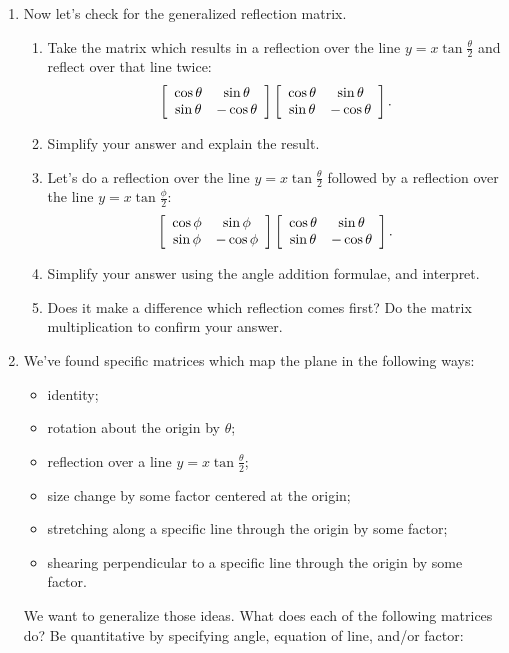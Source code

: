 \documentclass[../textbook.tex]{subfiles}
\begin{document}
\begin{enumerate}
\begin{enumerate}
\end{enumerate}
\item Now let's check for the generalized reflection matrix.
\begin{enumerate}
\item Take the matrix which results in a reflection over the line $y=x\tan \frac{\theta}{2}$ and reflect over that line twice: $$\left[\begin{array}{cc} \cos\theta & \sin\theta \\ \sin\theta & -\cos\theta \end{array}\right]\left[\begin{array}{cc} \cos\theta & \sin\theta \\ \sin\theta & -\cos\theta \end{array}\right].$$
\item Simplify your answer and explain the result.
\item Let's do a reflection over the line $y=x\tan\frac{\theta}{2}$ followed by a reflection over the line $y=x\tan\frac{\phi}{2}$:
$$\left[\begin{array}{cc} \cos\phi & \sin\phi \\ \sin\phi & -\cos\phi \end{array}\right]\left[\begin{array}{cc} \cos\theta & \sin\theta \\ \sin\theta & -\cos\theta \end{array}\right].$$
\item Simplify your answer using the angle addition formulae, and interpret.
\item Does it make a difference which reflection comes first? Do the matrix multiplication to confirm your answer.
\end{enumerate}
\item We've found specific matrices which map the plane in the following ways:
\setcounter{problem_i}{\value{enumi}}
\begin{itemize}
\item identity; %
\item rotation about the origin by $\theta$; %
\item reflection over a line $y=x \tan\frac{\theta}{2}$; %
\item size change by some factor centered at the origin; %
\item stretching along a specific line through the origin by some factor; %
\item shearing perpendicular to a specific line through the origin by some factor. %
\end{itemize}
\setcounter{enumi}{\value{problem_i}}
We want to generalize those ideas. What does each of the following matrices do? Be quantitative by specifying angle, equation of line, and/or factor:\label{prob:list_transformations}
\begin{enumerate}
\end{enumerate}
\end{enumerate}
\end{document}
